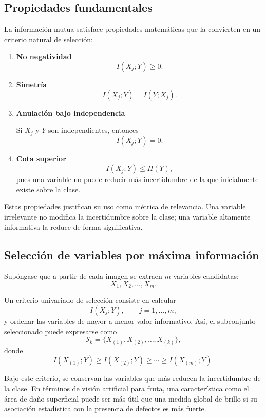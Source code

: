 \documentclass{article}
\begin{document}
\subsection{Propiedades fundamentales}

La información mutua satisface propiedades matemáticas que la convierten en un criterio natural de selección:

\begin{enumerate}
\item \textbf{No negatividad}
\[
I(X_j;Y)\geq 0.
\]

\item \textbf{Simetría}
\[
I(X_j;Y)=I(Y;X_j).
\]

\item \textbf{Anulación bajo independencia}

Si \(X_j\) y \(Y\) son independientes, entonces
\[
I(X_j;Y)=0.
\]

\item \textbf{Cota superior}
\[
I(X_j;Y)\leq H(Y),
\]
pues una variable no puede reducir más incertidumbre de la que inicialmente existe sobre la clase.
\end{enumerate}

Estas propiedades justifican su uso como métrica de relevancia. Una variable irrelevante no modifica la incertidumbre sobre la clase; una variable altamente informativa la reduce de forma significativa.

\subsection{Selección de variables por máxima información}

Supóngase que a partir de cada imagen se extraen \(m\) variables candidatas:
\[
X_1,X_2,\dots,X_m.
\]

Un criterio univariado de selección consiste en calcular
\[
I(X_j;Y), \qquad j=1,\dots,m,
\]
y ordenar las variables de mayor a menor valor informativo. Así, el subconjunto seleccionado puede expresarse como
\[
\mathcal{S}_k = \{X_{(1)},X_{(2)},\dots,X_{(k)}\},
\]
donde
\[
I(X_{(1)};Y)\geq I(X_{(2)};Y)\geq \cdots \geq I(X_{(m)};Y).
\]

Bajo este criterio, se conservan las variables que más reducen la incertidumbre de la clase. En términos de visión artificial para fruta, una característica como el área de daño superficial puede ser más útil que una medida global de brillo si su asociación estadística con la presencia de defectos es más fuerte.
\end{document}
